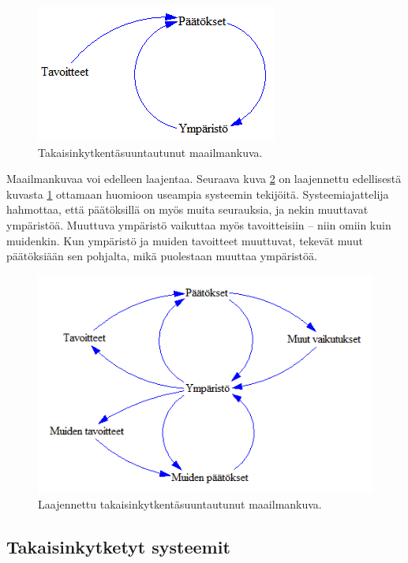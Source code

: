 \documentclass[finnish,12pt,a4paper,pdftex]{article}
\begin{document}
\begin{onehalfspacing}
\begin{figure}[H]
\centering \includegraphics{takaisinkytkentasuuntautunut}
\caption{Takaisinkytkentäsuuntautunut maailmankuva. \cite[s. 11]{Sterman2000} \label{sysdyn:takaisinkytkentasuuntautunut}}
\end{figure}

Maailmankuvaa voi edelleen laajentaa. Seuraava kuva \ref{sysdyn:laajennettutakaisinkytkentasuuntautunut} on laajennettu edellisestä kuvasta \ref{sysdyn:takaisinkytkentasuuntautunut} ottamaan huomioon useampia systeemin tekijöitä. Systeemiajattelija hahmottaa, että päätöksillä on myös muita seurauksia, ja nekin muuttavat ympäristöä. Muuttuva ympäristö vaikuttaa myös tavoitteisiin -- niin omiin kuin muidenkin. Kun ympäristö ja muiden tavoitteet muuttuvat, tekevät muut päätöksiään sen pohjalta, mikä puolestaan muuttaa ympäristöä. \cite[s. 11--12]{Sterman2000}

\begin{figure}[H]
\centering \includegraphics{laajennettutakaisinkytkentasuuntautunut}
\caption{Laajennettu takaisinkytkentäsuuntautunut maailmankuva. \cite[s. 11]{Sterman2000} \label{sysdyn:laajennettutakaisinkytkentasuuntautunut}}
\end{figure}


\subsection{Takaisinkytketyt systeemit \label{sysdyn:takaisinkytkenta}}


\end{onehalfspacing}
\end{document}
